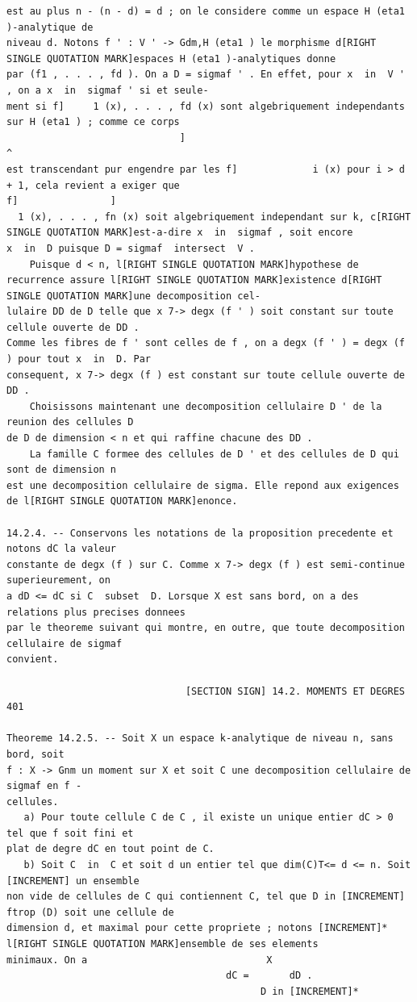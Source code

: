 \documentclass[
  11pt,
]{article}
\begin{document}
\begin{lstlisting}
est au plus n - (n - d) = d ; on le considere comme un espace H (eta1 )-analytique de
niveau d. Notons f ' : V ' -> Gdm,H (eta1 ) le morphisme d[RIGHT SINGLE QUOTATION MARK]espaces H (eta1 )-analytiques donne
par (f1 , . . . , fd ). On a D = sigmaf ' . En effet, pour x  in  V ' , on a x  in  sigmaf ' si et seule-
ment si f]     1 (x), . . . , fd (x) sont algebriquement independants sur H (eta1 ) ; comme ce corps
                              ]                                             ^
est transcendant pur engendre par les f]             i (x) pour i > d + 1, cela revient a exiger que
f]                ]
  1 (x), . . . , fn (x) soit algebriquement independant sur k, c[RIGHT SINGLE QUOTATION MARK]est-a-dire x  in  sigmaf , soit encore
x  in  D puisque D = sigmaf  intersect  V .
    Puisque d < n, l[RIGHT SINGLE QUOTATION MARK]hypothese de recurrence assure l[RIGHT SINGLE QUOTATION MARK]existence d[RIGHT SINGLE QUOTATION MARK]une decomposition cel-
lulaire DD de D telle que x 7-> degx (f ' ) soit constant sur toute cellule ouverte de DD .
Comme les fibres de f ' sont celles de f , on a degx (f ' ) = degx (f ) pour tout x  in  D. Par
consequent, x 7-> degx (f ) est constant sur toute cellule ouverte de DD .
    Choisissons maintenant une decomposition cellulaire D ' de la reunion des cellules D
de D de dimension < n et qui raffine chacune des DD .
    La famille C formee des cellules de D ' et des cellules de D qui sont de dimension n
est une decomposition cellulaire de sigma. Elle repond aux exigences de l[RIGHT SINGLE QUOTATION MARK]enonce.

14.2.4. -- Conservons les notations de la proposition precedente et notons dC la valeur
constante de degx (f ) sur C. Comme x 7-> degx (f ) est semi-continue superieurement, on
a dD <= dC si C  subset  D. Lorsque X est sans bord, on a des relations plus precises donnees
par le theoreme suivant qui montre, en outre, que toute decomposition cellulaire de sigmaf
convient.

                               [SECTION SIGN] 14.2. MOMENTS ET DEGRES                                401

Theoreme 14.2.5. -- Soit X un espace k-analytique de niveau n, sans bord, soit
f : X -> Gnm un moment sur X et soit C une decomposition cellulaire de sigmaf en f -
cellules.
   a) Pour toute cellule C de C , il existe un unique entier dC > 0 tel que f soit fini et
plat de degre dC en tout point de C.
   b) Soit C  in  C et soit d un entier tel que dim(C)T<= d <= n. Soit [INCREMENT] un ensemble
non vide de cellules de C qui contiennent C, tel que D in [INCREMENT] ftrop (D) soit une cellule de
dimension d, et maximal pour cette propriete ; notons [INCREMENT]* l[RIGHT SINGLE QUOTATION MARK]ensemble de ses elements
minimaux. On a                               X
                                      dC =       dD .
                                            D in [INCREMENT]*


\end{lstlisting}
\end{document}
